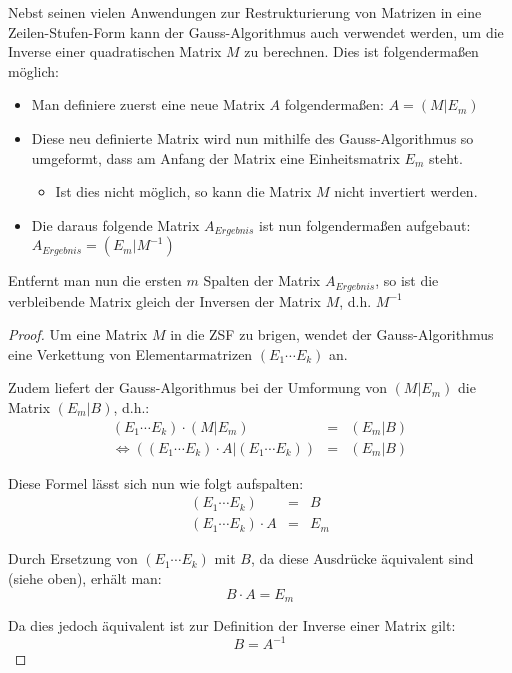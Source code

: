 Nebst seinen vielen Anwendungen zur Restrukturierung von Matrizen in eine Zeilen-Stufen-Form kann der Gauss-Algorithmus auch verwendet werden, um die Inverse einer quadratischen Matrix $M$ zu berechnen.
Dies ist folgendermaßen möglich:

\begin{itemize}
\item Man definiere zuerst eine neue Matrix $A$ folgendermaßen:
$A = (M|E_m)$
\item Diese neu definierte Matrix wird nun mithilfe des Gauss-Algorithmus so umgeformt, dass am Anfang der Matrix eine Einheitsmatrix $E_m$ steht.
\begin{itemize}
\item Ist dies nicht möglich, so kann die Matrix $M$ nicht invertiert werden.
\end{itemize}
\item Die daraus folgende Matrix $A_{Ergebnis}$ ist nun folgendermaßen aufgebaut: $A_{Ergebnis} = (E_m|M^{-1})$
\end{itemize}
Entfernt man nun die ersten $m$ Spalten der Matrix $A_{Ergebnis}$, so ist die verbleibende Matrix gleich der Inversen der Matrix $M$, d.h. $M^{-1}$

\begin{proof}
Um eine Matrix $M$ in die ZSF zu brigen, wendet der Gauss-Algorithmus eine Verkettung von Elementarmatrizen $(E_1 \cdots E_k)$ an.

Zudem liefert der Gauss-Algorithmus bei der Umformung von $(M|E_m)$ die Matrix $(E_m|B)$, d.h.: 
\begin{eqnarray*}
 (E_1 \cdots E_k) \cdot (M|E_m) &=& (E_m|B) \\
 \Leftrightarrow 
 ((E_1 \cdots E_k) \cdot A | (E_1 \cdots E_k)) &=& (E_m|B)
\end{eqnarray*}

Diese Formel lässt sich nun wie folgt aufspalten:
\begin{eqnarray*}
 (E_1 \cdots E_k) &=& B \\
(E_1 \cdots E_k) \cdot A &=& E_m
\end{eqnarray*}

Durch Ersetzung von $(E_1\cdots E_k)$ mit $B$, da diese Ausdrücke äquivalent sind (siehe oben), erhält man:
\[ B\cdot A = E_m \]

Da dies jedoch äquivalent ist zur Definition der Inverse einer Matrix gilt:
\[ B=A^{-1}\]

\end{proof}
